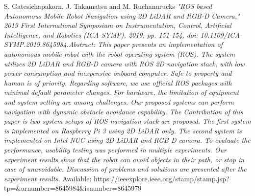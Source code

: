 \documentclass[twoside,12pt,times,onecolumn,a4paper]{report}
\begin{document}
\begin{thebibliography}{9}
S. Gatesichapakorn, J. Takamatsu and M. Ruchanurucks
\textit{"ROS based Autonomous Mobile Robot Navigation using 2D LiDAR and RGB-D Camera," 2019 First International Symposium on Instrumentation, Control, Artificial Intelligence, and Robotics (ICA-SYMP), 2019, pp. 151-154, doi: 10.1109/ICA-SYMP.2019.8645984.Abstract: This paper presents an implementation of autonomous mobile robot with the robot operating system (ROS). The system utilizes 2D LiDAR and RGB-D camera with ROS 2D navigation stack, with low power consumption and inexpensive onboard computer. Safe to property and human is of priority. Regarding software, we use official ROS packages with minimal default parameter changes. For hardware, the limitation of equipment and system setting are among challenges. Our proposed systems can perform navigation with dynamic obstacle avoidance capability. The Contribution of this paper is two system setups of ROS navigation stack are proposed. The first system is implemented on Raspberry Pi 3 using 2D LiDAR only. The second system is implemented on Intel NUC using 2D LiDAR and RGB-D camera. To evaluate the performance, usability testing was performed in multiple experiments. Our experiment results show that the robot can avoid objects in their path, or stop in case of unavoidable. Discussion of problems and solutions are presented after the experiment results. }
Available: https://ieeexplore.ieee.org/stamp/stamp.jsp?tp=\&arnumber=8645984\&isnumber=8645979




\end{thebibliography}
\end{document}
